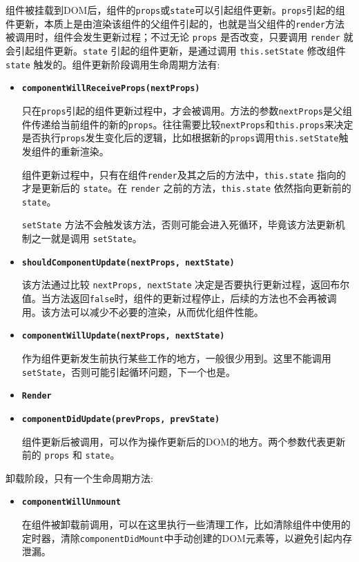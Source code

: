 组件被挂载到DOM后，组件的\texttt{props}或\texttt{state}可以引起组件更新。\texttt{props}引起的组件更新，本质上是由渲染该组件的父组件引起的，也就是当父组件的\texttt{render}方法被调用时，组件会发生更新过程；不过无论 \texttt{props} 是否改变，只要调用 \texttt{render} 就会引起组件更新。\texttt{state} 引起的组件更新，是通过调用 \texttt{this.setState} 修改组件 \texttt{state} 触发的。组件更新阶段调用生命周期方法有:
\begin{itemize}
  \item \textbf{\texttt{componentWillReceiveProps(nextProps)}}
  
  只在\texttt{props}引起的组件更新过程中，才会被调用。方法的参数\texttt{nextProps}是父组件传递给当前组件的新的\texttt{props}。往往需要比较\texttt{nextProps}和\texttt{this.props}来决定是否执行\texttt{props}发生变化后的逻辑，比如根据新的\texttt{props}调用\texttt{this.setState}触发组件的重新渲染。

  组件更新过程中，只有在组件\texttt{render}及其之后的方法中，\texttt{this.state} 指向的才是更新后的 \texttt{state}。在 \texttt{render} 之前的方法，\texttt{this.state} 依然指向更新前的 \texttt{state}。

  \texttt{setState} 方法不会触发该方法，否则可能会进入死循环，毕竟该方法更新机制之一就是调用 \texttt{setState}。

  \item \textbf{\texttt{shouldComponentUpdate(nextProps, nextState)}}
  
  该方法通过比较 \texttt{nextProps, nextState} 决定是否要执行更新过程，返回布尔值。当方法返回\texttt{false}时，组件的更新过程停止，后续的方法也不会再被调用。该方法可以减少不必要的渲染，从而优化组件性能。

  \item \textbf{\texttt{componentWillUpdate(nextProps, nextState)}}
  
  作为组件更新发生前执行某些工作的地方，一般很少用到。这里不能调用 \texttt{setState}，否则可能引起循环问题，下一个也是。

  \item \textbf{\texttt{Render}}
  \item \textbf{\texttt{componentDidUpdate(prevProps, prevState)}}
  
  组件更新后被调用，可以作为操作更新后的DOM的地方。两个参数代表更新前的 \texttt{props} 和 \texttt{state}。

\end{itemize}

卸载阶段，只有一个生命周期方法:
\begin{itemize}
  \item \textbf{\texttt{componentWillUnmount}}
  
  在组件被卸载前调用，可以在这里执行一些清理工作，比如清除组件中使用的定时器，清除\texttt{componentDidMount}中手动创建的DOM元素等，以避免引起内存泄漏。
\end{itemize}

